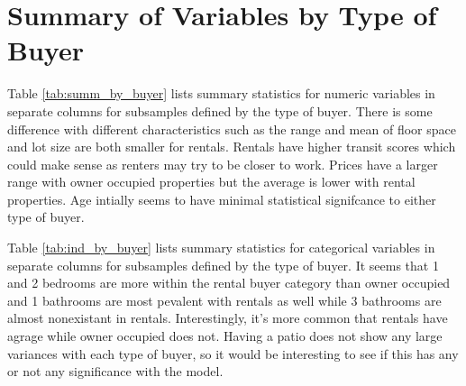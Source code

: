 %
%
%
%
%
% 
%


\section{Summary of Variables by Type of Buyer}

Table \ref{tab:summ_by_buyer} lists summary statistics for numeric variables
in separate columns for subsamples defined by the type of buyer. There is some difference with different characteristics such as the range and mean of floor space and lot size are both smaller for rentals. Rentals have higher transit scores which could make sense as renters may try to be closer to work. Prices have a larger range with owner occupied properties but the average is lower with rental properties. Age intially seems to have minimal statistical signifcance to either type of buyer.



\pagebreak
Table \ref{tab:ind_by_buyer} lists summary statistics for categorical variables
in separate columns for subsamples defined by the type of buyer. It seems that 1 and 2 bedrooms are more within the rental buyer category than owner occupied and 1 bathrooms are most pevalent with rentals as well while 3 bathrooms are almost nonexistant in rentals.
Interestingly, it's more common that rentals have agrage while owner occupied does not. Having a patio does not show any large variances with each type of buyer, so it would be interesting to see if this has any or not any significance with the model.

